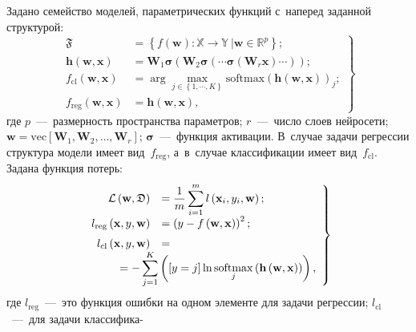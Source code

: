 \begin{multicols}{2}
Задано семейство моделей, параметрических функций с~наперед заданной 
структурой:
\begin{equation}
\left.
\begin{array}{rl}
\mathfrak{F} &= \left\{f\left(\mathbf{w}\right):\mathbb{X} \to 
\mathbb{Y}~| \mathbf{w} \in \mathbb{R}^{p}\right\}; \\[6pt]
\mathbf{h}\left(\mathbf{w}, \mathbf{x}\right) &= 
\mathbf{W}_1\boldsymbol{\sigma}\left(\mathbf{W}_2\boldsymbol{\sigma}\left
(\cdots\boldsymbol{\sigma}\left(
\mathbf{W}_r\mathbf{x}\right)\cdots\right)\right);\\[6pt]
f_{\mathrm{cl}}\left(\mathbf{w}, \mathbf{x}\right) &= \arg \max\limits_{j 
\in \left\{1,\cdots, K\right\}} 
\mathrm{softmax}\left(\mathbf{h}\left(\mathbf{w}, 
\mathbf{x}\right)\right)_{j};\! \\[6pt]
\!\!\!f_{\mathrm{reg}}\left(\mathbf{w}, \mathbf{x}\right) & = 
\mathbf{h}\left(\mathbf{w}, \mathbf{x}\right),
\end{array}\!\!
\right\}\!
\label{eq:st:2}
\end{equation}
где $p$~---~размерность пространства параметров; $r$~---~число слоев 
нейросети; $\mathbf{w} = \mathrm{vec}\left[\mathbf{W}_1, \mathbf{W}_2, 
\ldots, \mathbf{W}_r\right]$; $\boldsymbol{\sigma}$~---~функция 
активации. 
В~случае задачи регрессии структура модели имеет вид~$f_{\mathrm{reg}}$, 
а~в~случае классификации имеет вид~$f_{\mathrm{cl}}$.
Задана функция потерь:
\begin{equation}
\left.
\begin{array}{rl}
\mathcal{L}\left(\mathbf{w}, \mathfrak{D}\right) &=\displaystyle 
\fr{1}{m}\sum\limits_{i=1}^{m}l\left(\mathbf{x}_{i}, y_i, 
\mathbf{w}\right);\\[6pt]
l_{\mathrm{reg}}\left(\mathbf{x}, y, \mathbf{w}\right) &= \left(y - 
f\left(\mathbf{w}, \mathbf{x}\right)\right)^{2};\\[6pt]
l_{\mathrm{cl}}\left(\mathbf{x}, y, \mathbf{w}\right) &= \\
&\hspace*{-40pt}\displaystyle{}= -
\sum\limits_{j=1}^{K}\left([y = 
j]\ln\mathop{\mathrm{softmax}}\limits_j\left(\mathbf{h}\left(\mathbf{w}, 
\mathbf{x}\right)\right)\right),
\end{array}
\right\}
\label{eq:st:3}
\end{equation}
где $l_{\mathrm{reg}}$~---~это функция ошибки на одном элементе для 
задачи регрессии; $l_{\mathrm{cl}}$~---~для задачи классифика-\linebreak\columnbreak


\end{multicols}
